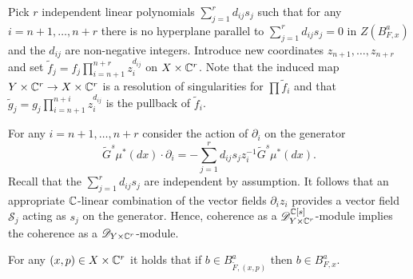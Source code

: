   Pick $r$ independent linear polynomials $\sum_{j=1}^r d_{ij}s_j$ such that for any $i=n+1,\ldots,n+r$ there is no hyperplane parallel to $\sum_{j=1}^r d_{ij}s_j = 0$ in $Z(B_{F,x}^a)$ and the $d_{ij}$ are non-negative integers.
  Introduce new coordinates $z_{n+1}, \ldots,z_{n+r}$ and set $\widetilde{f}_j = f_j\prod_{i=n+1}^{n+r} \allowbreak z_{i}^{d_{ij}}$ on $X\times \mathbb{C}^r$.
  Note that the induced map $Y\times \mathbb{C}^r \to X\times \mathbb{C}^r$ is a resolution of singularities for $\prod \widetilde{f}_i$ and that $\widetilde{g}_j = g_j\prod_{i=n+1}^{n+i} z_{i}^{d_{ij}}$ is the pullback of $\widetilde{f}_i$.

  For any $i=n+1,\ldots,n+r$ consider the action of $\partial_{i}$ on the generator
  $$\widetilde{G}^s \mu^*(dx)\cdot \partial_{i} = -\sum_{j=1}^r d_{ij}s_j z_{i}^{-1} \widetilde{G}^s \mu^*(dx).$$
  Recall that the $\sum_{j=1}^r d_{ij}s_j$ are independent by assumption.
  It follows that an appropriate $\mathbb{C}$-linear combination of the vector fields $\partial_{i}z_{i}$ provides a vector field $\mathcal{S}_j$ acting as $s_j$ on the generator.
  Hence, coherence as a $\mathscr{D}_{Y\times \mathbb{C}^r}^{\mathbb{C}[s]}$-module implies the coherence as a $\mathscr{D}_{Y\times \mathbb{C}^r}$-module.
  \begin{lemma}\label{lem: ReplacementIsAllowed}
    For any $(x,p) \in X\times \mathbb{C}^r$ it holds that if $b\in B_{\widetilde{F},(x,p)}^a$ then $b \in B_{F,x}^a$.
  \end{lemma}

